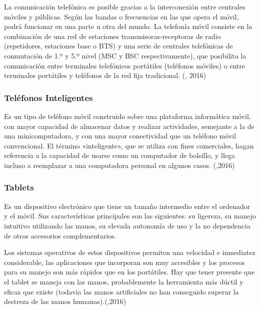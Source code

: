 La comunicación telefónica es posible gracias a la interconexión entre centrales móviles y públicas. Según las bandas o frecuencias en las que opera el móvil, podrá funcionar en una parte u otra del mundo. La telefonía móvil consiste en la combinación de una red de estaciones transmisoras-receptoras de radio (repetidores, estaciones base o BTS) y una serie de centrales telefónicas de conmutación de 1.º y 5.º nivel (MSC y BSC respectivamente), que posibilita la comunicación entre terminales telefónicos portátiles (teléfonos móviles) o entre terminales portátiles y teléfonos de la red fija tradicional.
\setlength{\parskip}{0mm}
(\citet{celbib}, 2016)

\subsubsection{Teléfonos Inteligentes}
\setlength{\parskip}{5mm}
Es un tipo de teléfono móvil construido sobre una plataforma informática móvil, con mayor capacidad de almacenar datos y realizar actividades, semejante a la de una minicomputadora, y con una mayor conectividad que un teléfono móvil convencional. El término «inteligente», que se utiliza con fines comerciales, hagan referencia a la capacidad de usarse como un computador de bolsillo, y llega incluso a reemplazar a una computadora personal en algunos casos.
(\citet{},2016)
\setlength{\parskip}{0mm}
\subsubsection{Tablets}
\setlength{\parskip}{5mm}
Es un dispositivo electrónico que tiene un tamaño intermedio entre el ordenador y el móvil. Sus características principales son las siguientes: su ligereza, su manejo intuitivo utilizando las manos, su elevada autonomía de uso y la no dependencia de otros accesorios complementarios.

Los sistemas operativos de estos dispositivos permiten una velocidad e inmediatez considerable, las aplicaciones que incorporan son muy accesibles y los procesos para su manejo son más rápidos que en los portátiles. Hay que tener presente que el tablet se maneja con las manos, probablemente la herramienta más dúctil y eficaz que existe (todavía las manos artificiales no han conseguido superar la destreza de las manos humanas).(\citet{tabletbib},2016)
\setlength{\parskip}{0mm}



